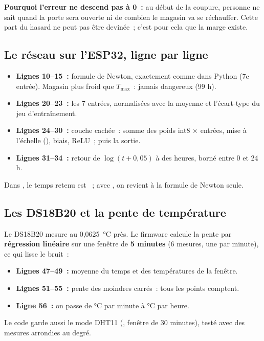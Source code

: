 \textbf{Pourquoi l'erreur ne descend pas à 0~:} au début de la coupure, personne ne sait quand la porte sera ouverte ni de combien le magasin va se réchauffer. Cette part du hasard ne peut pas être devinée~; c'est pour cela que la marge existe.

\subsection{Le réseau sur l'ESP32, ligne par ligne}

\begin{itemize}
  \item \textbf{Lignes 10--15~:} formule de Newton, exactement comme dans Python (7e entrée). Magasin plus froid que $T_{\max}$~: jamais dangereux (99 h).
  \item \textbf{Lignes 20--23~:} les 7 entrées, normalisées avec la moyenne et l'écart-type du jeu d'entraînement.
  \item \textbf{Lignes 24--30~:} couche cachée~: somme des poids int8 $\times$ entrées, mise à l'échelle (), biais, ReLU~; puis la sortie.
  \item \textbf{Lignes 31--34~:} retour de $\log(t+0{,}05)$ à des heures, borné entre 0 et 24 h.
\end{itemize}
Dans , le temps retenu est ~; avec , on revient à la formule de Newton seule.

\subsection{Les DS18B20 et la pente de température}
Le DS18B20 mesure au 0,0625~°C près. Le firmware calcule la pente par \textbf{régression linéaire} sur une fenêtre de \textbf{5 minutes} (6 mesures, une par minute), ce qui lisse le bruit~:

\begin{itemize}
  \item \textbf{Lignes 47--49~:} moyenne du temps et des températures de la fenêtre.
  \item \textbf{Lignes 51--55~:} pente des moindres carrés~: tous les points comptent.
  \item \textbf{Ligne 56~:} on passe de °C par minute à °C par heure.
\end{itemize}
Le code garde aussi le mode DHT11 (, fenêtre de 30 minutes), testé avec des mesures arrondies au degré.

